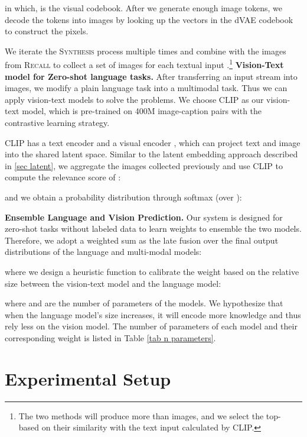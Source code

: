 \documentclass[11pt]{article}
\begin{document}
in which,  is the visual codebook. After we generate enough image tokens, we decode the tokens into images by looking up the vectors in the dVAE codebook to construct the pixels. 

We iterate the \textsc{Synthesis} process multiple times and combine with the images from \textsc{Recall} to collect a set of  images  for each textual input .\footnote{The two methods will produce more than  images, and we select the top- based on their similarity with the text input calculated by CLIP.}
\medbreak
\noindent\textbf{Vision-Text model for Zero-shot language tasks.} After transferring an input stream into images, we modify a plain language task into a multimodal task. Thus we can apply vision-text models to solve the problems. We choose CLIP \cite{radford2021learning} as our vision-text model, which is pre-trained on 400M image-caption pairs with the contrastive learning strategy. 

CLIP has a text encoder  and a visual encoder , which can project text and image into the shared latent space. Similar to the latent embedding approach described in \ref{sec latent}, we aggregate the  images collected previously and use CLIP to compute the relevance score of :

and we obtain a probability distribution through softmax (over ):

\medbreak
\noindent\textbf{Ensemble Language and Vision Prediction.} Our system is designed for zero-shot tasks without labeled data to learn weights to ensemble the two models. Therefore, we adopt a weighted sum as the late fusion over the final output distributions of the language and multi-modal models:

where we design a heuristic function to calibrate the weight  based on the relative size between the vision-text model and the language model:

where  and  are the number of parameters of the models. We hypothesize that when the language model's size increases, it will encode more knowledge and thus rely less on the vision model. The number of parameters of each model and their corresponding weight is listed in Table \ref{tab n parameters}.

\section{Experimental Setup}
\end{document}
